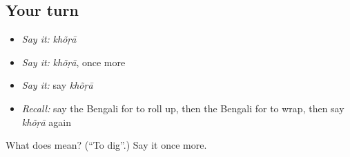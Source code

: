 \subsection*{Your turn}
\begin{itemize}
\raggedright
  \item \emph{Say it:} \emph{khõṛā}
  \item \emph{Say it:} \emph{khõṛā}, once more
  \item \emph{Say it:} say \emph{khõṛā}
  \item \emph{Recall:} say the Bengali for to roll up, then the Bengali for to wrap, then say \emph{khõṛā} again
\end{itemize}

\begin{tcolorbox}[breakable,colback=teal!4,colframe=teal!35!black,title={Before you move on}]
What does  mean? (\textquotedblleft{}To dig\textquotedblright{}.) Say it once more.
\end{tcolorbox}

